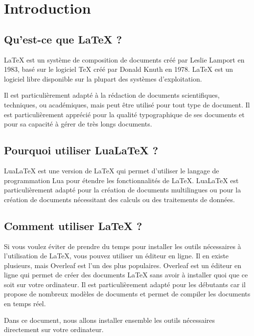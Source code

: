 \documentclass[../main.tex]{subfiles}
\begin{document}
\chapter{Introduction}

\section{Qu'est-ce que \LaTeX{} ?}

\LaTeX{} est un système de composition de documents créé par Leslie Lamport en 1983, basé sur le logiciel TeX créé par Donald Knuth en 1978. \LaTeX{} est un logiciel libre disponible sur la plupart des systèmes d'exploitation.

Il est particulièrement adapté à la rédaction de documents scientifiques, techniques, ou académiques, mais peut être utilisé pour tout type de document. Il est particulièrement apprécié pour la qualité typographique de ses documents et pour sa capacité à gérer de très longs documents.

\section{Pourquoi utiliser Lua\LaTeX{} ?}

Lua\LaTeX{} est une version de \LaTeX{} qui permet d'utiliser le langage de programmation Lua pour étendre les fonctionnalités de \LaTeX{}. Lua\LaTeX{} est particulièrement adapté pour la création de documents multilingues ou pour la création de documents nécessitant des calculs ou des traitements de données.

\section{Comment utiliser \LaTeX{} ?}

Si vous voulez éviter de prendre du temps pour installer les outils nécessaires à l'utilisation de \LaTeX{}, vous pouvez utiliser un éditeur en ligne. Il en existe plusieurs, mais Overleaf est l'un des plus populaires. Overleaf est un éditeur en ligne qui permet de créer des documents \LaTeX{} sans avoir à installer quoi que ce soit sur votre ordinateur. Il est particulièrement adapté pour les débutants car il propose de nombreux modèles de documents et permet de compiler les documents en temps réel.

Dans ce document, nous allons installer ensemble les outils nécessaires directement sur votre ordinateur.
\end{document}

